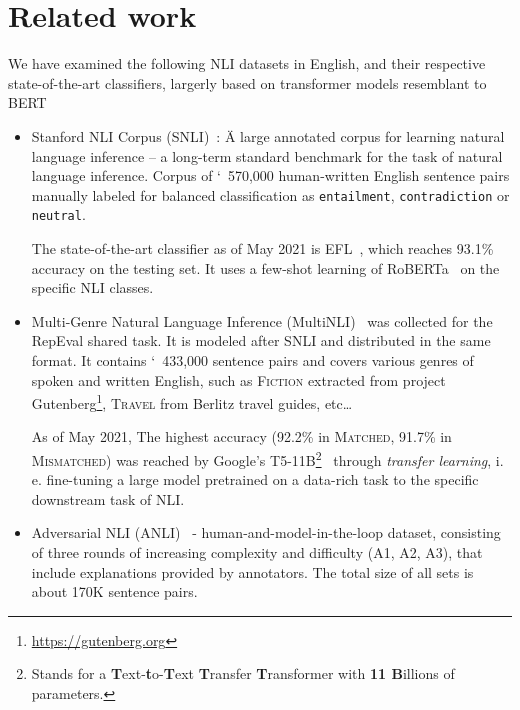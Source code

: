 \section{Related work}
\label{sec:nlicorp}
We have examined the following NLI datasets in English, and their respective state-of-the-art classifiers, largerly based on transformer models resemblant to \textsf{BERT}~\cite{bert}
\begin{itemize}
    \item {\techbf Stanford NLI Corpus} ({\techbf SNLI})~\cite{snli:emnlp2015}: \"{A large annotated corpus for learning natural language inference} -- a long-term standard benchmark for the task of natural language inference. Corpus of \char`~570,000 human-written English sentence pairs manually labeled for balanced classification as \texttt{entailment}, \texttt{contradiction} or \texttt{neutral}.
    
    The state-of-the-art classifier as of May 2021 is \textsf{EFL}~\cite{wang2021entailment}, which reaches 93.1\% accuracy on the testing set. It uses a few-shot learning of \textsf{RoBERTa}~\cite{roberta} on the specific NLI classes.
    
    \item {\techbf Multi-Genre Natural Language Inference} ({\techbf MultiNLI})~\cite{multinli} was collected for the \textsf{RepEval} shared task. It is  modeled after \textsf{SNLI} and distributed in the same format. It contains \char`~433,000 sentence pairs and covers various genres of spoken and written English, such as \textsc{Fiction} extracted from project \textsf{Gutenberg}\footnote{\url{https://gutenberg.org}}, \textsc{Travel} from \textsf{Berlitz} travel guides, etc\dots
    
    As of May 2021, The highest accuracy (92.2\% in \textsc{Matched}, 91.7\% in \textsc{Mismatched}) was reached by \textsf{Google}'s \textsf{T5-11B}\footnote{Stands for a \textbf{T}ext-\textbf{t}o-\textbf{T}ext \textbf{T}ransfer \textbf{T}ransformer with \textbf{11 B}illions of parameters.}~\cite{t5-11b} through \textit{transfer learning}, i. e. fine-tuning a large model pretrained on a data-rich task to the specific downstream task of NLI.
    
    \item {\techbf Adversarial NLI} ({\techbf ANLI})~\cite{anli} - human-and-model-in-the-loop dataset, consisting of three rounds of increasing complexity and difficulty (\textsf{A1}, \textsf{A2}, \textsf{A3}), that include explanations provided by annotators. The total size of all sets is about 170K sentence pairs.
    

\end{itemize}

